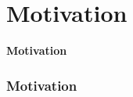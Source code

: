 \section{Motivation}
\begin{frame}[plain, c]
    \begin{center}
        \Huge \textcolor{NavyBlue}{\textbf{Motivation}}
    \end{center}
\end{frame}

\begin{frame}
    \frametitle{Motivation}
\end{frame}